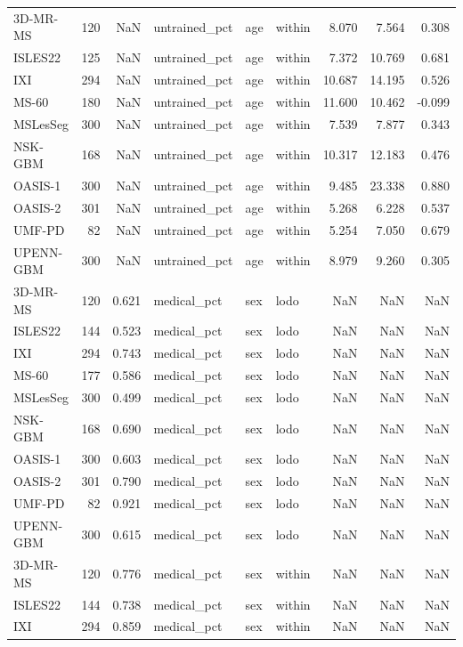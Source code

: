 \begin{tabular}{lrrlllrrr}
3D-MR-MS & 120 & NaN & untrained\_pct & age & within & 8.070 & 7.564 & 0.308 \\
ISLES22 & 125 & NaN & untrained\_pct & age & within & 7.372 & 10.769 & 0.681 \\
IXI & 294 & NaN & untrained\_pct & age & within & 10.687 & 14.195 & 0.526 \\
MS-60 & 180 & NaN & untrained\_pct & age & within & 11.600 & 10.462 & -0.099 \\
MSLesSeg & 300 & NaN & untrained\_pct & age & within & 7.539 & 7.877 & 0.343 \\
NSK-GBM & 168 & NaN & untrained\_pct & age & within & 10.317 & 12.183 & 0.476 \\
OASIS-1 & 300 & NaN & untrained\_pct & age & within & 9.485 & 23.338 & 0.880 \\
OASIS-2 & 301 & NaN & untrained\_pct & age & within & 5.268 & 6.228 & 0.537 \\
UMF-PD & 82 & NaN & untrained\_pct & age & within & 5.254 & 7.050 & 0.679 \\
UPENN-GBM & 300 & NaN & untrained\_pct & age & within & 8.979 & 9.260 & 0.305 \\
3D-MR-MS & 120 & 0.621 & medical\_pct & sex & lodo & NaN & NaN & NaN \\
ISLES22 & 144 & 0.523 & medical\_pct & sex & lodo & NaN & NaN & NaN \\
IXI & 294 & 0.743 & medical\_pct & sex & lodo & NaN & NaN & NaN \\
MS-60 & 177 & 0.586 & medical\_pct & sex & lodo & NaN & NaN & NaN \\
MSLesSeg & 300 & 0.499 & medical\_pct & sex & lodo & NaN & NaN & NaN \\
NSK-GBM & 168 & 0.690 & medical\_pct & sex & lodo & NaN & NaN & NaN \\
OASIS-1 & 300 & 0.603 & medical\_pct & sex & lodo & NaN & NaN & NaN \\
OASIS-2 & 301 & 0.790 & medical\_pct & sex & lodo & NaN & NaN & NaN \\
UMF-PD & 82 & 0.921 & medical\_pct & sex & lodo & NaN & NaN & NaN \\
UPENN-GBM & 300 & 0.615 & medical\_pct & sex & lodo & NaN & NaN & NaN \\
3D-MR-MS & 120 & 0.776 & medical\_pct & sex & within & NaN & NaN & NaN \\
ISLES22 & 144 & 0.738 & medical\_pct & sex & within & NaN & NaN & NaN \\
IXI & 294 & 0.859 & medical\_pct & sex & within & NaN & NaN & NaN \\

\end{tabular}
